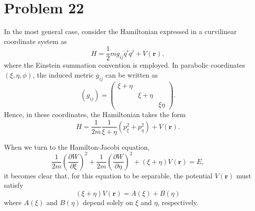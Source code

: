 \section*{Problem 22}   

    In the most general case, consider the Hamiltonian expressed in a curvilinear coordinate system as
    \begin{equation*}
        H = \frac{1}{2} m g_{ij} \dot{q}^i \dot{q}^j  +  V\left(\boldsymbol{r}\right),
    \end{equation*}
    where the Einstein summation convention is employed. In parabolic coordinates $(\xi, \eta, \phi)$, the induced metric $g_{ij}$ can be written as
    \begin{equation}
        \left(g_{ij}\right)  = \left(
        \begin{matrix}
            \xi + \eta  &               &           \\
                        & \xi + \eta    &           \\
                        &               &  \xi\eta
        \end{matrix}
        \right).
    \end{equation}
    Hence, in these coordinates, the Hamiltonian takes the form
    \begin{equation}
        H = \frac{1}{2m} \frac{1}{\xi+\eta} \left( p_\xi^2 + p_\eta^2 \right)  +  V\left(\boldsymbol{r}\right).
    \end{equation}

    When we turn to the Hamilton-Jacobi equation,
    \begin{equation}
        \frac{1}{2m} \left(\frac{\partial W}{\partial\xi}\right)^2 + \frac{1}{2m} \left(\frac{\partial W}{\partial\eta}\right)^2  +  \left(\xi+\eta\right)V\left(\boldsymbol{r}\right) = E,
    \end{equation}
    it becomes clear that, for this equation to be separable, the potential $V(\mathbf{r})$ must satisfy
    \begin{equation}
        \left(\xi+\eta\right)V\left(\boldsymbol{r}\right) = A\left(\xi\right) + B\left(\eta\right)
    \end{equation}
    where $A(\xi)$ and $B(\eta)$ depend solely on $\xi$ and $\eta$, respectively.
